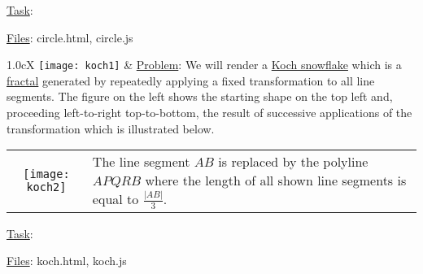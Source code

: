 \documentclass[addpoints]{exam}
\begin{document}
\begin{questions}
    \underline{Task}:
    \underline{Files}: circle.html, circle.js

  

\begin{tabularx}{1.0\linewidth}{cX}
    \texttt{[image: koch1]}
  &
    \vspace{10pt} \underline{Problem}: We will render a \href{https://en.wikipedia.org/wiki/Koch_snowflake}{Koch snowflake} which is a \href{http://mathworld.wolfram.com/Fractal.html}{fractal} generated by repeatedly applying a fixed transformation to all line segments. The figure on the left shows the starting shape on the top left and, proceeding left-to-right top-to-bottom, the result of successive applications of the transformation which is illustrated below.
    
    {\begin{tabularx}{0.63\textwidth}{cX}
    \texttt{[image: koch2]}
      & The line segment $AB$ is replaced by the polyline $APQRB$ where the length of all shown line segments is equal to $\frac{|AB|}{3}$.
    \end{tabularx}}
\end{tabularx}

\underline{Task}:
    \underline{Files}: koch.html, koch.js
    


\end{questions}
\end{document}
